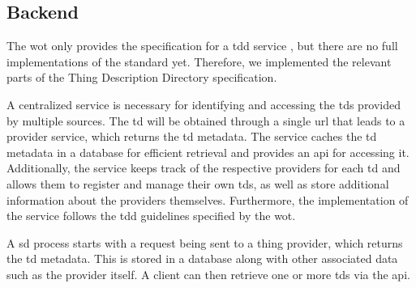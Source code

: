 \subsection{Backend}\label{sec:backend}

The \gls{wot} only provides the specification for a \gls{tdd} service \autocite[section 7.3]{w3c.wot.discovery.20210602}, but there are no full implementations of the standard yet. Therefore, we implemented the relevant parts of the Thing Description Directory specification.

A centralized service is necessary for identifying and accessing the \glspl{td} provided by multiple sources. The \gls{td} will be obtained through a single \gls{url} that leads to a provider service, which returns the \gls{td} metadata. The service caches the \gls{td} metadata in a database for efficient retrieval and provides an \gls{api} for accessing it. Additionally, the service keeps track of the respective providers for each \gls{td} and allows them to register and manage their own \glspl{td}, as well as store additional information about the providers themselves. Furthermore, the implementation of the service follows the \gls{tdd} guidelines specified by the \gls{wot}.

A \gls{sd} process starts with a request being sent to a thing provider, which returns the \gls{td} metadata. This is stored in a database along with other associated data such as the provider itself. A client can then retrieve one or more \glspl{td} via the \gls{api}.



